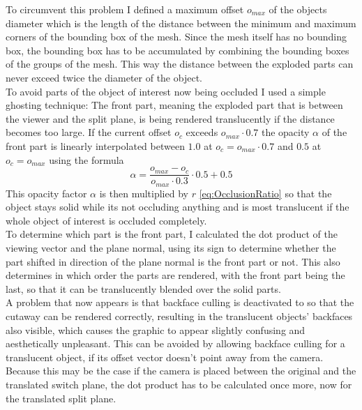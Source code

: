To circumvent this problem I defined a maximum offset $o_{max}$ of the objects diameter which is the length of the distance between the minimum and maximum corners of the bounding box of the mesh. Since the mesh itself has no bounding box, the bounding box has to be accumulated by combining the bounding boxes of the groups of the mesh. This way the distance between the exploded parts can never exceed twice the diameter of the object.\\
To avoid parts of the object of interest now being occluded I used a simple ghosting technique: 
The front part, meaning the exploded part that is between the viewer and the split plane, is being rendered translucently if the distance becomes too large.
If the current offset $o_c$ exceeds $o_{max} \cdot 0.7$ the opacity $\alpha$ of the front part is linearly interpolated between $1.0$ at $o_c = o_{max} \cdot 0.7$ and $0.5$ at  $o_c = o_{max}$ using the formula
\begin{equation}
	\alpha = \frac{o_{max}-o_c}{o_{max} \cdot 0.3} \cdot 0.5 + 0.5
\end{equation}
This opacity factor $\alpha$ is then multiplied by $r$ \ref{eq:OcclusionRatio}  so that the object stays solid while its not occluding anything and is most translucent if the whole object of interest is occluded completely.\\
To determine which part is the front part, I calculated the dot product of the viewing vector and the plane normal, using its sign to determine whether the part shifted in direction of the plane normal is the front part or not. This also determines in which order the parts are rendered, with the front part being the last, so that it can be translucently blended over the solid parts.\\
A problem that now appears is that backface culling is deactivated to so that the cutaway can be rendered correctly, resulting in the translucent objects' backfaces also visible, which causes the graphic to appear slightly confusing and aesthetically unpleasant. This can be avoided by allowing backface culling for a translucent object, if its offset vector doesn't point away from the camera. Because this may be the case if the camera is placed between the original and the translated switch plane, the dot product has to be calculated once more, now for the translated split plane.\\
